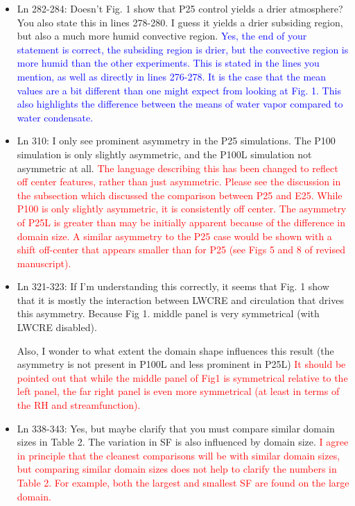 \documentclass[draft]{agujournal2019}
\begin{document}
\begin{itemize}
  \item Ln 282-284:  Doesn't Fig. 1 show that P25 control yields a drier atmosphere? You also state this in lines 278-280. I guess it yields a drier subsiding region, but also a much more humid convective region. 
  \textcolor{blue}{Yes, the end of your statement is correct, the subsiding region is drier, but the convective region is more humid than the other experiments.  This is stated in the lines you mention, as well as directly in lines 276-278.  It is the case that the mean values are a bit different than one might expect from looking at Fig. 1.  This also highlights the difference between the means of water vapor compared to water condensate.}
  
  \item Ln 310: I only see prominent asymmetry in the P25 simulations. The P100 simulation is only slightly asymmetric, and the P100L simulation not asymmetric at all.
  \textcolor{red}{The language describing this has been changed to reflect off center features, rather than just asymmetric.  Please see the discussion in the subsection which discussed 
  the comparison between P25 and E25.   While P100 is only slightly asymmetric, it is 
  consistently off center.  The asymmetry of P25L is greater than may be initially apparent because of the difference in domain size.  A similar asymmetry to the P25 case would 
  be shown with a shift off-center that appears smaller than for P25 (see Figs 5 and 8 of revised manuscript).  }
  
  \item Ln 321-323:   If I'm understanding this correctly, it seems that Fig. 1 show that it is mostly the interaction between LWCRE and 
  circulation that drives this asymmetry. Because Fig 1. middle panel is very symmetrical (with LWCRE disabled).

Also, I wonder to what extent the domain shape influences 
  this result (the asymmetry is not present in P100L and less prominent in P25L)
  \textcolor{red}{It should be pointed out that while the middle panel of Fig1 is symmetrical relative to the left panel, 
  the far right panel is even more symmetrical (at least in terms of the RH and streamfunction).}
  
  \item Ln 338-343: Yes, but maybe clarify that you must compare similar domain sizes in Table 2. The variation in SF is also influenced by domain size. 
  \textcolor{red}{I agree in principle that the cleanest comparisons will be with similar domain sizes, but comparing similar domain sizes does not help to clarify the numbers in Table 2.  For example, both the largest and smallest SF are found on the large domain.  }
  

\end{itemize}
\end{document}
